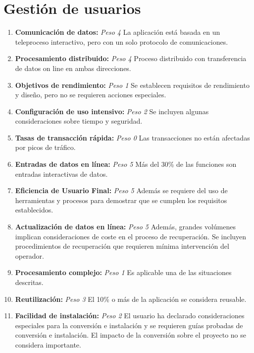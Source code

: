 \documentclass[11pt,a4paper,spanish,twoside]{book}
\begin{document}
\section{Gestión de usuarios}
\begin{enumerate}[{\bf 1.}]

\item {\bf Comunicación de datos:} \emph{Peso 4} La aplicación está basada en
  un teleproceso interactivo, pero con un solo protocolo de comunicaciones.

\item {\bf Procesamiento distribuido:} \emph{Peso 4} Proceso distribuido
  con transferencia de datos on line en ambas direcciones. 

\item {\bf Objetivos de rendimiento:} \emph{Peso 1} Se establecen requisitos
  de rendimiento y diseño, pero no se requieren acciones especiales.

\item {\bf Configuración de uso intensivo:} \emph{Peso 2} Se incluyen algunas
  consideraciones sobre tiempo y seguridad. 

\item {\bf Tasas de transacción rápida:} \emph{Peso 0} Las transacciones no
  están afectadas por picos de tráfico. 

\item {\bf Entradas de datos en línea:} \emph{Peso 5} Más del 30\% de las
  funciones son entradas interactivas de datos. 

\item {\bf Eficiencia de Usuario Final:} \emph{Peso 5} Además se requiere del
  uso de herramientas y procesos para demostrar que se cumplen los requisitos
  establecidos.

\item {\bf Actualización de datos en línea:} \emph{Peso 5} Además, grandes
  volúmenes implican consideraciones de coste en el proceso de
  recuperación. Se incluyen procedimientos de recuperación que requieren
  mínima intervención del operador. 

\item {\bf Procesamiento complejo:} \emph{Peso 1} Es aplicable una de las
  situaciones descritas. 

\item {\bf Reutilización:} \emph{Peso 3} El 10\% o más de la aplicación se
  considera reusable. 

\item {\bf Facilidad de instalación:} \emph{Peso 2} El usuario ha declarado
  consideraciones especiales para la conversión e instalación y se requieren
  guías probadas de conversión e instalación. El impacto de la conversión
  sobre el proyecto no se considera importante. 


\end{enumerate}
\end{document}
